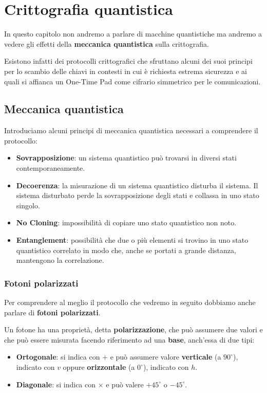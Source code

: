 \chapter{Crittografia quantistica}
In questo capitolo non andremo a parlare di macchine quantistiche ma andremo a vedere gli effetti della
\textbf{meccanica quantistica} sulla crittografia.

Esistono infatti dei protocolli crittografici che sfruttano alcuni dei suoi principi per lo scambio delle chiavi in
contesti in cui \`e richiesta estrema sicurezza e ai quali si affianca un One-Time Pad come cifrario simmetrico per
le comunicazioni.

\section{Meccanica quantistica}
Introduciamo alcuni principi di meccanica quantistica necessari a comprendere il protocollo:
\begin{itemize}
	\item \textbf{Sovrapposizione}: un sistema quantistico pu\`o trovarsi in diversi stati contemporaneamente.
	\item \textbf{Decoerenza}: la misurazione di un sistema quantistico disturba il sistema. Il sistema disturbato
	      perde la sovrapposizione degli stati e collassa in uno stato singolo.
	\item \textbf{No Cloning}: impossibilit\`a di copiare uno stato quantistico non noto.
	\item \textbf{Entanglement}: possibilit\`a che due o pi\`u elementi si trovino in uno stato quantistico correlato
	      in modo che, anche se portati a grande distanza, mantengono la correlazione.
\end{itemize}

\subsection{Fotoni polarizzati}
Per comprendere al meglio il protocollo che vedremo in seguito dobbiamo anche parlare di \textbf{fotoni polarizzati}.

Un fotone ha una propriet\`a, detta \textbf{polarizzazione}, che pu\`o assumere due valori e che pu\`o essere misurata
facendo riferimento ad una \textbf{base}, anch'essa di due tipi:
\begin{itemize}
	\item \textbf{Ortogonale}: si indica con $+$ e pu\`o assumere valore \textbf{verticale} (a $90^\circ$), indicato con
	      $v$ oppure \textbf{orizzontale} (a $0^\circ$), indicato con $h$.
	\item \textbf{Diagonale}: si indica con $\times$ e pu\`o valere $+45^\circ$ o $-45^\circ$.
\end{itemize}

